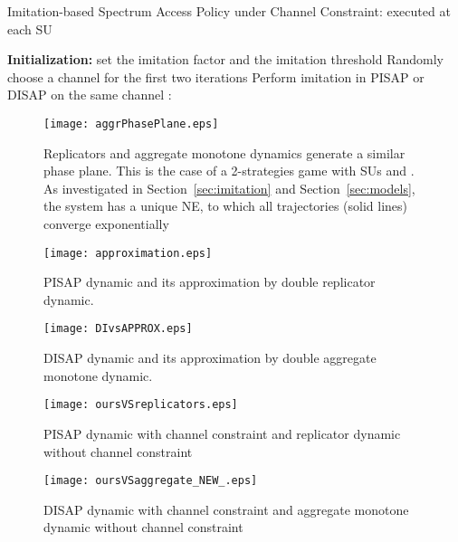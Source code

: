\documentclass[12pt, onecolumn]{IEEEtran}
\theoremstyle{plain}
\theoremstyle{definition}
\begin{document}
\begin{algorithm}
\caption{Imitation-based Spectrum Access Policy under Channel Constraint: executed at each SU }
\begin{algorithmic}[1]
\STATE \textbf{Initialization:} set the imitation factor  and the imitation threshold 
\STATE Randomly choose a channel for the first two iterations 
\STATE Perform imitation in PISAP or DISAP on the same channel
\STATE :
\ENDWHILE
\end{algorithmic}
\label{algo:generic_imitation}
\end{algorithm}



\begin{figure}
 \centering
\texttt{[image: aggrPhasePlane.eps]}
\caption{Replicators and aggregate monotone dynamics generate a similar phase plane. This is the case of a 2-strategies game with  SUs and . As investigated in
Section~\ref{sec:imitation} and Section~\ref{sec:models}, the system has a unique NE, to which all trajectories (solid lines) converge exponentially}
\label{fig:phasePlane}
\end{figure}

\begin{figure*} \begin{minipage}[r]{0.49\linewidth}
\texttt{[image: approximation.eps]}
\caption{PISAP dynamic and its approximation by double replicator dynamic.}
\label{fig:approximation}
\end{minipage} \hfill
\begin{minipage}[c]{0.49\linewidth}
\texttt{[image: DIvsAPPROX.eps]}
\caption{DISAP dynamic and its approximation by double aggregate monotone dynamic.}
\label{fig:DIvsAPPROX}
\end{minipage}\hfill
\vspace{0.5cm}
\end{figure*}

\begin{figure*}
\begin{minipage}[r]{0.49\linewidth}
\texttt{[image: oursVSreplicators.eps]}
\caption{PISAP dynamic with channel constraint and replicator dynamic without channel constraint}
\label{fig:oursVSreplicators}
\end{minipage} \hfill
\begin{minipage}[c]{0.49\linewidth}
\texttt{[image: oursVSaggregate\_NEW\_.eps]}
\caption{DISAP dynamic with channel constraint and aggregate monotone dynamic without channel constraint}
\label{fig:oursVSaggregate}
\end{minipage}\hfill
\vspace{0.5cm}
\end{figure*}
\end{document}
